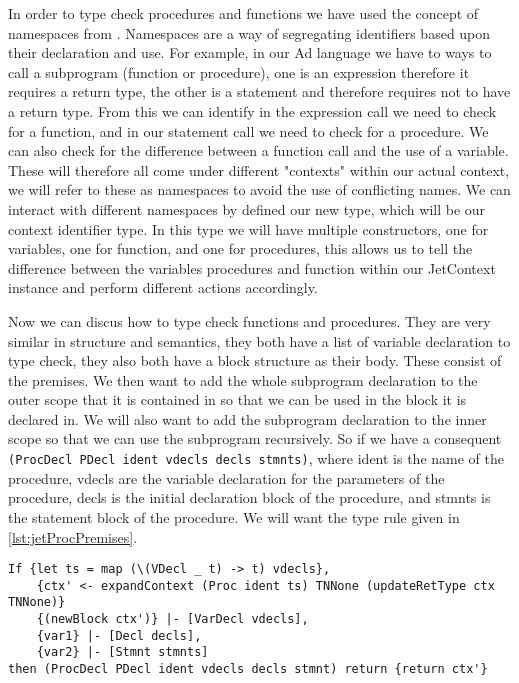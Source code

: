 In order to type check procedures and functions we have used the concept of namespaces from \textcite{grimm2007typical}.
Namespaces are a way of segregating identifiers based upon their declaration and use.
For example, in our Ad language we have to ways to call a subprogram (function or procedure), one is an expression therefore it requires a return type, the other is a statement and therefore requires not to have a return type.
From this we can identify in the expression call we need to check for a function, and in our statement call we need to check for a procedure.
We can also check for the difference between a function call and the use of a variable.
These will therefore all come under different "contexts" within our actual context, we will refer to these as namespaces to avoid the use of conflicting names.
We can interact with different namespaces by defined our new type, which will be our context identifier type.
In this type we will have multiple constructors, one for variables, one for function, and one for procedures, this allows us to tell the difference between the variables procedures and function within our JetContext instance and perform different actions accordingly.

Now we can discus how to type check functions and procedures.
They are very similar in structure and semantics, they both have a list of variable declaration to type check, they also both have a block structure as their body.
These consist of the premises.
We then want to add the whole subprogram declaration to the outer scope that it is contained in so that we can be used in the block it is declared in.
We will also want to add the subprogram declaration to the inner scope so that we can use the subprogram recursively.
So if we have a consequent \texttt{(ProcDecl PDecl ident vdecls decls stmnts)}, where ident is the name of the procedure, vdecls are the variable declaration for the parameters of the procedure, decls is the initial declaration block of the procedure, and stmnts is the statement block of the procedure.
We will want the type rule given in \autoref{lst:jetProcPremises}.
\begin{lstlisting}[caption = Jet premise list for procedures., label=lst:jetProcPremises]
If {let ts = map (\(VDecl _ t) -> t) vdecls},
    {ctx' <- expandContext (Proc ident ts) TNNone (updateRetType ctx TNNone)}
    {(newBlock ctx')} |- [VarDecl vdecls], 
    {var1} |- [Decl decls], 
    {var2} |- [Stmnt stmnts]
then (ProcDecl PDecl ident vdecls decls stmnt) return {return ctx'}
\end{lstlisting}

